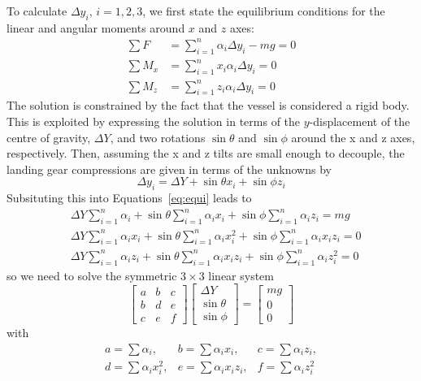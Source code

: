 \documentclass[Orbiter Technical Reference.tex]{subfiles}
\begin{document}
To calculate $\Delta y_i$, $i=1,2,3$, we first state the equilibrium conditions for the linear and angular moments around $x$ and $z$ axes:
\begin{equation}\label{eq:equi}
\begin{split}
\sum F &= \sum_{i=1}^{n} \alpha_i \Delta y_i - m g = 0 \\
\sum M_x &= \sum_{i=1}^{n} x_i \alpha_i \Delta y_i = 0 \\
\sum M_z &= \sum_{i=1}^{n} z_i \alpha_i \Delta y_i = 0
\end{split}
\end{equation}
The solution is constrained by the fact that the vessel is considered a rigid body. This is exploited by expressing the solution in terms of the $y$-displacement of the centre of gravity, $\Delta Y$, and two rotations $\sin \theta$ and $\sin \phi$ around the x and z axes, respectively. Then, assuming the x and z tilts are small enough to decouple, the landing gear compressions are given in terms of the unknowns by
\begin{equation}\label{eq:prm}
\Delta y_i = \Delta Y + \sin \theta x_i + \sin \phi z_i
\end{equation}
Subsituting this into Equations~\ref{eq:equi} leads to
\begin{equation}
\begin{split}
&\Delta Y \sum_{i=1}^{n} \alpha_i + \sin\theta \sum_{i=1}^{n} \alpha_i x_i + \sin\phi \sum_{i=1}^{n} \alpha_i z_i = mg \\
&\Delta Y \sum_{i=1}^{n} \alpha_i x_i + \sin\theta \sum_{i=1}^{n} \alpha_i x_i^2 + \sin\phi \sum_{i=1}^{n} \alpha_i x_i z_i = 0 \\
&\Delta Y \sum_{i=1}^{n} \alpha_i z_i + \sin\theta \sum_{i=1}^{n} \alpha_i x_i z_i + \sin\phi \sum_{i=1}^{n} \alpha_i z_i^2 = 0
\end{split}
\end{equation}
so we need to solve the symmetric $3\times 3$ linear system
\begin{equation}\label{eq:linsys}
\left[\begin{array}{ccc}
a&b&c \\
b&d&e \\
c&e&f \end{array}\right]
\left[\begin{array}{c}
\Delta Y \\ \sin\theta \\ \sin\phi \end{array}\right]
=
\left[\begin{array}{c}
mg \\ 0 \\ 0 \end{array}\right]
\end{equation}
with
\begin{equation}
\begin{array}{lll}
a = \sum \alpha_i, & b = \sum \alpha_i x_i, & c = \sum \alpha_i z_i, \\
d = \sum \alpha_i x_i^2, & e = \sum \alpha_i x_i z_i, & f = \sum \alpha_i z_i^2
\end{array}
\end{equation}
\end{document}
